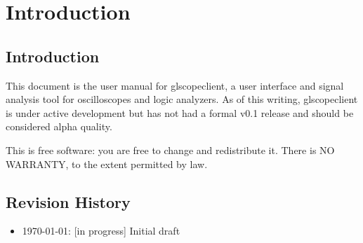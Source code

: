 \chapter{Introduction}

\section{Introduction}
This document is the user manual for glscopeclient, a user interface and signal analysis tool for oscilloscopes and
logic analyzers. As of this writing, glscopeclient is under active development but has not had a formal v0.1 release
and should be considered alpha quality.

This is free software: you are free to change and redistribute it.
There is NO WARRANTY, to the extent permitted by law.

\section{Revision History}
\begin{itemize}
\item \today: [in progress] Initial draft
\end{itemize}

